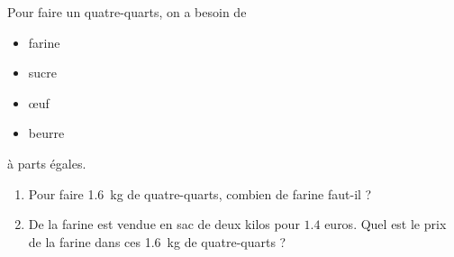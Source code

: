 

\begin{rituel}

    Pour faire un quatre-quarts, on a besoin de
    \begin{itemize}
        \item farine
        \item sucre
        \item œuf
        \item beurre
    \end{itemize}
    à parts égales.

    \begin{enumerate}
        \item
    Pour faire \SI{1.6}{\kilo\gram} de quatre-quarts, combien de farine faut-il ?
\item
    De la farine est vendue en sac de deux kilos pour \( 1.4\) euros. Quel est le prix de la farine dans ces \SI{1.6}{\kilo\gram} de quatre-quarts ?
    \end{enumerate}

\end{rituel}
